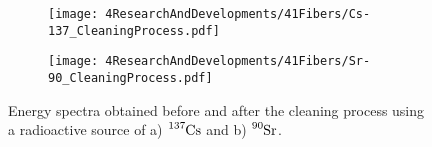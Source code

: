 \begin{figure}
\centering
    \begin{subfigure}[b]{1\textwidth}
    \centering
    \texttt{[image: 4ResearchAndDevelopments/41Fibers/Cs-137\_CleaningProcess.pdf]}  
    \caption{\label{subfig:EnergySpectrumCo60CleaningTest}}
    \end{subfigure}
    \hfill
    \begin{subfigure}[b]{1\textwidth}
    \centering
    \texttt{[image: 4ResearchAndDevelopments/41Fibers/Sr-90\_CleaningProcess.pdf]}  
    \caption{\label{subfig:EnergySpectrumSr90CleaningTest}}
    \end{subfigure}
 \caption{Energy spectra obtained before and after the cleaning process using a radioactive source of a) $\ce{^{137}Cs}$ and b) $\ce{^{90}Sr}$.}
 \label{fig:ResultsOfCleaningProcess}
\end{figure}


